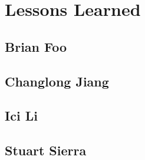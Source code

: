 \chapter{Lessons Learned}

\section{Brian Foo}

\section{Changlong Jiang}

\section{Ici Li}

\section{Stuart Sierra}

